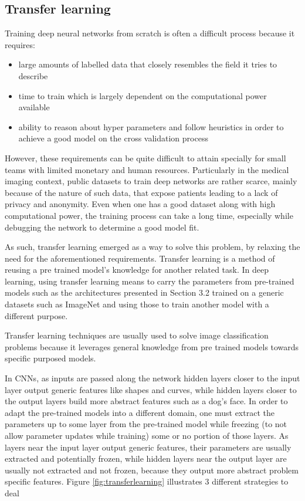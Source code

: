 \subsection{Transfer learning}
    Training deep neural networks from scratch is often a difficult process because it requires:
    \begin{itemize}
    \item large amounts of labelled data that closely resembles the field it tries to describe 
    \item time to train which is largely dependent on the computational power available 
    \item ability to reason about hyper parameters and follow heuristics in order to achieve a good model on the cross validation process
    \end{itemize}
    However, these requirements can be quite difficult to attain specially for small teams with limited monetary and human resources. Particularly in the medical imaging context, public datasets to train deep networks are rather scarce, mainly because of the nature of such data, that expose patients leading to a lack of privacy and anonymity. 
    Even when one has a good dataset along with high computational power, the training process can take a long time, especially while debugging the network to determine a good model fit. \par
    As such, transfer learning emerged as a way to solve this problem, by  relaxing the need for the aforementioned requirements. Transfer learning is a method of reusing a pre trained model's knowledge for another related task\cite{DipanjanSarkarRaghavBali2018}. In deep learning, using transfer learning means to carry the parameters from pre-trained models such as the architectures presented in Section 3.2 trained on a generic datasets such as ImageNet and using those to train another model with a different purpose.\par Transfer learning techniques are usually used to solve image classification problems \cite{Ly2019} because it leverages general knowledge from pre trained models towards specific purposed models. \par
    In \ac{CNN}s, as inputs are passed along the network hidden layers closer to the input layer output generic features like shapes and curves, while hidden layers closer to the output layers build more abstract features such as a dog's face. In order to adapt the pre-trained models into a different domain, one must extract the parameters up to some layer from the pre-trained model while freezing (to not allow parameter updates while training) some or no portion of those layers. As layers near the input layer output generic features, their parameters are usually extracted and potentially frozen, while hidden layers near the output layer are usually not extracted and not frozen, because they output more abstract problem specific features. Figure \ref{fig:transferlearning} illustrates 3 different strategies to deal 
